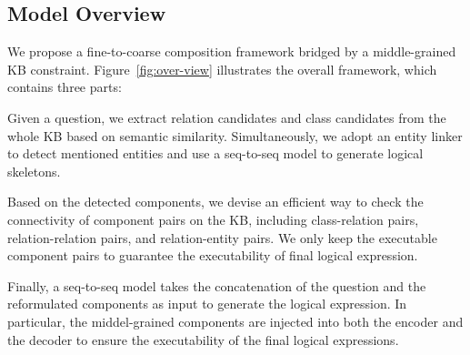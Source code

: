 



\subsection{Model Overview}
We propose a fine-to-coarse composition framework \smodel bridged by a middle-grained KB constraint. Figure~\ref{fig:over-view} illustrates the overall framework, which contains three parts:

 Given a question, we extract relation candidates and class candidates from the whole KB based on semantic similarity. Simultaneously, we adopt an entity linker to detect mentioned entities and use a seq-to-seq model to generate logical skeletons. 

Based on the detected components, we devise an efficient way to check the connectivity of component pairs on the KB, including class-relation pairs, relation-relation pairs, and relation-entity pairs. We only keep the executable component pairs to guarantee the executability of final logical expression. 

Finally, a seq-to-seq model takes the concatenation of the question and the reformulated components as input to generate the logical expression. In particular, the middel-grained components are injected into both the encoder and the decoder to ensure the executability of the final logical expressions.

